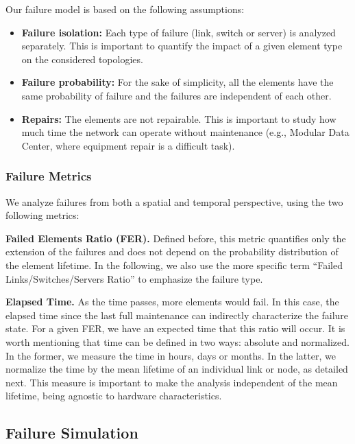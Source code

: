 Our failure model is based on the following assumptions:
\begin{itemize}
\item \textbf{Failure isolation:} Each type of failure (link, switch or server) is analyzed separately. This is important to quantify the impact of a given element type on the considered topologies.
\item \textbf{Failure probability:} For the sake of simplicity, all the elements have the same probability of failure and the failures are independent of each other.
\item \textbf{Repairs:} The elements are not repairable. This is important to study how much time the network can operate without maintenance (e.g., Modular Data Center, where equipment repair is a difficult task).
\end{itemize}
\subsubsection{Failure Metrics}
\label{sec:simulationOverview}

We analyze failures from both a spatial and temporal perspective, using the two following metrics:

\textbf{Failed Elements Ratio (FER).} Defined before, this metric quantifies only the extension of the failures and does not depend on the probability distribution of the element lifetime. In the following, we also use the more specific term ``Failed Links/Switches/Servers Ratio'' to emphasize the failure type. 

\textbf{Elapsed Time.} As the time passes, more elements would fail. In this case, the elapsed time since the last full maintenance can indirectly characterize the failure state.
For a given FER, we have an expected time that this ratio will occur. 
It is worth mentioning that time can be defined in two ways: absolute and normalized. In the former, we measure the time in hours, days or months. In the latter, we normalize the time by the mean lifetime of an individual link or node, as detailed next. This measure is important to make the analysis independent of the mean lifetime, being agnostic to hardware characteristics.
\subsection{Failure Simulation}
\label{sec:failureSimMethodology}

